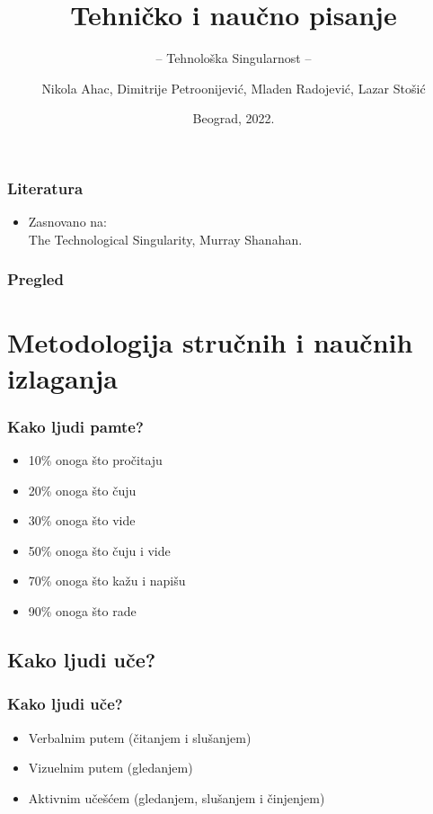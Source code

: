 \documentclass{beamer}
\title{Tehničko i naučno pisanje}
\subtitle{-- Tehnološka Singularnost --}
\author{Nikola Ahac, Dimitrije Petroonijević, Mladen Radojević, Lazar Stošić}
\institute{Matematički fakultet\\Univerzitet u Beogradu}
\date{
	\footnotesize{Beograd, 2022.}	
}
\begin{document}
\begin{frame}
	\thispagestyle{empty}
	\titlepage
\end{frame}

\addtocounter{framenumber}{-1}

\begin{frame}[fragile]\frametitle{Literatura}
	\begin{itemize}
		\item Zasnovano na:\\
		The Technological Singularity, Murray Shanahan.
	\end{itemize}
\end{frame}

\begin{frame}
	\frametitle{Pregled} %
	\tableofcontents[hidesubsections] 
\end{frame}

\section{Metodologija stručnih i naučnih izlaganja}

\begin{frame}[fragile]\frametitle{Kako ljudi pamte?}
	\begin{itemize}	
		\item 10\% onoga što pročitaju
		\item 20\% onoga što čuju
		\item 30\% onoga što vide
		\item 50\% onoga što čuju i vide
		\item 70\% onoga što kažu i napišu
		\item 90\% onoga što rade
	\end{itemize}
\end{frame}

\subsection{Kako ljudi uče?}

\begin{frame}[fragile]\frametitle{Kako ljudi uče?}
	\begin{itemize}	
		\item Verbalnim putem (čitanjem i slušanjem)
		\item Vizuelnim putem (gledanjem)
		\item Aktivnim učešćem (gledanjem, slušanjem i činjenjem)
	\end{itemize}
\end{frame}
\end{document}
